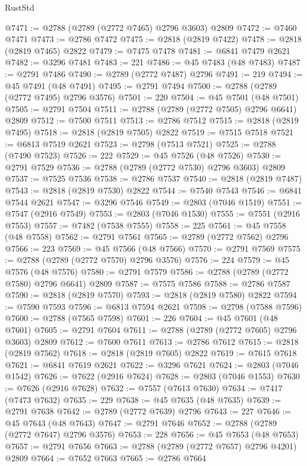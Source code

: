 \begin{lexlean}{RustStd}
\begin{coremodule}
@7471 := @2788 (@2789 (@2772 @7465) @2796 @3603) @2809
@7472 := @7460 @7471
@7473 := @2786 @7472
@7475 := @2818 (@2819 @7422)
@7478 := @2818 (@2819 @7465) @2822
@7479 := @7475 @7478
@7481 := @6841 @7479 @2621
@7482 := @3296 @7481
@7483 := 221
@7486 := @45 @7483 (@48 @7483)
@7487 := @2791 @7486
@7490 := @2789 (@2772 @7487) @2796
@7491 := 219
@7494 := @45 @7491 (@48 @7491)
@7495 := @2791 @7494
@7500 := @2788 (@2789 (@2772 @7495) @2796 @3576)
@7501 := 220
@7504 := @45 @7501 (@48 @7501)
@7505 := @2791 @7504
@7511 := @2788 (@2789 (@2772 @7505) @2796 @6641) @2809
@7512 := @7500 @7511
@7513 := @2786 @7512
@7515 := @2818 (@2819 @7495)
@7518 := @2818 (@2819 @7505) @2822
@7519 := @7515 @7518
@7521 := @6813 @7519 @2621
@7523 := @2798 (@7513 @7521)
@7525 := @2788 (@7490 @7523)
@7526 := 222
@7529 := @45 @7526 (@48 @7526)
@7530 := @2791 @7529
@7536 := @2788 (@2789 (@2772 @7530) @2796 @3603) @2809
@7537 := @7525 @7536
@7538 := @2786 @7537
@7540 := @2818 (@2819 @7487)
@7543 := @2818 (@2819 @7530) @2822
@7544 := @7540 @7543
@7546 := @6841 @7544 @2621
@7547 := @3296 @7546
@7549 := @2803 (@7046 @1519)
@7551 := @7547 (@2916 @7549)
@7553 := @2803 (@7046 @1530)
@7555 := @7551 (@2916 @7553)
@7557 := @7482 (@7538 @7555)
@7558 := 225
@7561 := @45 @7558 (@48 @7558)
@7562 := @2791 @7561
@7565 := @2789 (@2772 @7562) @2796
@7566 := 223
@7569 := @45 @7566 (@48 @7566)
@7570 := @2791 @7569
@7575 := @2788 (@2789 (@2772 @7570) @2796 @3576)
@7576 := 224
@7579 := @45 @7576 (@48 @7576)
@7580 := @2791 @7579
@7586 := @2788 (@2789 (@2772 @7580) @2796 @6641) @2809
@7587 := @7575 @7586
@7588 := @2786 @7587
@7590 := @2818 (@2819 @7570)
@7593 := @2818 (@2819 @7580) @2822
@7594 := @7590 @7593
@7596 := @6813 @7594 @2621
@7598 := @2798 (@7588 @7596)
@7600 := @2788 (@7565 @7598)
@7601 := 226
@7604 := @45 @7601 (@48 @7601)
@7605 := @2791 @7604
@7611 := @2788 (@2789 (@2772 @7605) @2796 @3603) @2809
@7612 := @7600 @7611
@7613 := @2786 @7612
@7615 := @2818 (@2819 @7562)
@7618 := @2818 (@2819 @7605) @2822
@7619 := @7615 @7618
@7621 := @6841 @7619 @2621
@7622 := @3296 @7621
@7624 := @2803 (@7046 @1542)
@7626 := @7622 (@2916 @7624)
@7628 := @2803 (@7046 @1553)
@7630 := @7626 (@2916 @7628)
@7632 := @7557 (@7613 @7630)
@7634 := @7417 (@7473 @7632)
@7635 := 229
@7638 := @45 @7635 (@48 @7635)
@7639 := @2791 @7638
@7642 := @2789 (@2772 @7639) @2796
@7643 := 227
@7646 := @45 @7643 (@48 @7643)
@7647 := @2791 @7646
@7652 := @2788 (@2789 (@2772 @7647) @2796 @3576)
@7653 := 228
@7656 := @45 @7653 (@48 @7653)
@7657 := @2791 @7656
@7663 := @2788 (@2789 (@2772 @7657) @2796 @4201) @2809
@7664 := @7652 @7663
@7665 := @2786 @7664

\end{coremodule}
\end{lexlean}
